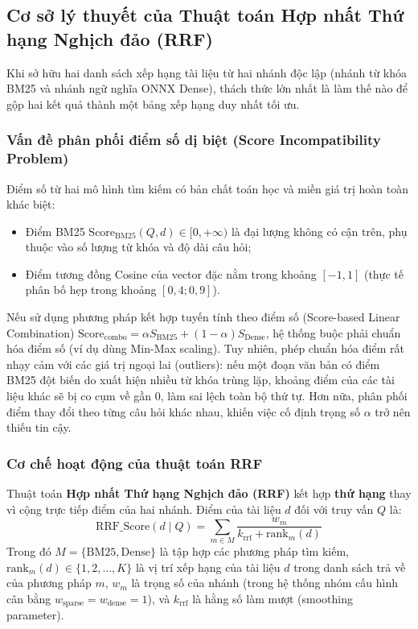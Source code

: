 \subsection{Cơ sở lý thuyết của Thuật toán Hợp nhất Thứ hạng Nghịch đảo (RRF)}

Khi sở hữu hai danh sách xếp hạng tài liệu từ hai nhánh độc lập (nhánh từ khóa BM25 và nhánh ngữ nghĩa ONNX Dense), thách thức lớn nhất là làm thế nào để gộp hai kết quả thành một bảng xếp hạng duy nhất tối ưu.

\subsubsection{Vấn đề phân phối điểm số dị biệt (Score Incompatibility Problem)}

Điểm số từ hai mô hình tìm kiếm có bản chất toán học và miền giá trị hoàn toàn khác biệt:
\begin{itemize}[nosep]
  \item Điểm BM25 $\text{Score}_{\text{BM25}}(Q, d) \in [0, +\infty)$ là đại lượng không có cận trên, phụ thuộc vào số lượng từ khóa và độ dài câu hỏi;
  \item Điểm tương đồng Cosine của vector đặc nằm trong khoảng $[-1, 1]$ (thực tế phân bố hẹp trong khoảng $[0{,}4; 0{,}9]$).
\end{itemize}
Nếu sử dụng phương pháp kết hợp tuyến tính theo điểm số (Score-based Linear Combination) $\text{Score}_{\text{combo}} = \alpha S_{\text{BM25}} + (1-\alpha) S_{\text{Dense}}$, hệ thống buộc phải chuẩn hóa điểm số (ví dụ dùng Min-Max scaling). Tuy nhiên, phép chuẩn hóa điểm rất nhạy cảm với các giá trị ngoại lai (outliers): nếu một đoạn văn bản có điểm BM25 đột biến do xuất hiện nhiều từ khóa trùng lặp, khoảng điểm của các tài liệu khác sẽ bị co cụm về gần 0, làm sai lệch toàn bộ thứ tự. Hơn nữa, phân phối điểm thay đổi theo từng câu hỏi khác nhau, khiến việc cố định trọng số $\alpha$ trở nên thiếu tin cậy.

\subsubsection{Cơ chế hoạt động của thuật toán RRF}

Thuật toán \textbf{Hợp nhất Thứ hạng Nghịch đảo (RRF)} \cite{rrf_cormack_2009} kết hợp \textbf{thứ hạng} thay vì cộng trực tiếp điểm của hai nhánh. Điểm của tài liệu $d$ đối với truy vấn $Q$ là:
\begin{equation}
  \text{RRF\_Score}(d \mid Q) = \sum_{m \in M} \frac{w_m}{k_{\text{rrf}} + \text{rank}_m(d)}
  \label{eq:rrf_formula}
\end{equation}
Trong đó $M = \{\text{BM25}, \text{Dense}\}$ là tập hợp các phương pháp tìm kiếm, $\text{rank}_m(d) \in \{1, 2, \dots, K\}$ là vị trí xếp hạng của tài liệu $d$ trong danh sách trả về của phương pháp $m$, $w_m$ là trọng số của nhánh (trong hệ thống nhóm cấu hình cân bằng $w_{\text{sparse}} = w_{\text{dense}} = 1$), và $k_{\text{rrf}}$ là hằng số làm mượt (smoothing parameter).

